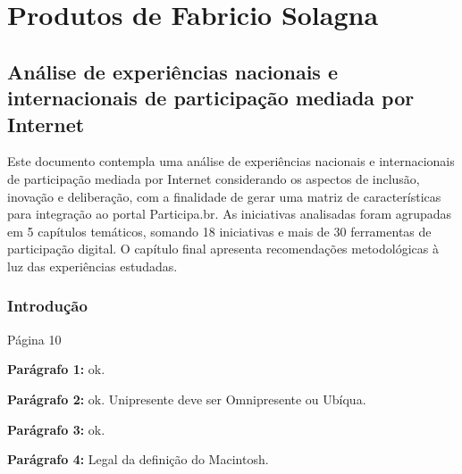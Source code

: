 \documentclass[12pt]{report}
\newcommand{\PalavrasChave}{reconhecimento de padrões, redes complexas, processamento de linguagem natural, participação social}
\newcommand{\pp}[1]{

\textbf{Parágrafo #1:}
}
\begin{document}



\tableofcontents
\newpage


\begin{abstract}
Este documento registra a reflexão sobre produtos dos outros consultores do mesmo projeto (BRA/12/018).
Cada consultor entrega alguns ``produtos'' para os órgãos interessados. No caso, são documentos escritos,
que relatam atividades, pesquisas, propostas, enfim, o que for pertinente para o trabalho.
Na leitura destes documentos, são registradas anotações pertinentes à consultoria de contrato 2013/000566, sob responsabilidade
do autor deste produto extra. Cada parte do documento corresponde a um consultor, cada capítulo corresponde
a um documento/produto, as seções e subseções correspondem à estrutura original de cada documento considerado.\\

{\bf Palavras-chave:} \PalavrasChave.
\end{abstract}
\newpage
\part{Produtos de Fabricio Solagna}
\chapter{Análise de experiências nacionais e internacionais de participação mediada por Internet}
Este documento contempla uma análise de experiências nacionais e internacionais de
participação mediada por Internet considerando os aspectos de inclusão, inovação e
deliberação, com a finalidade de gerar uma matriz de características para integração ao portal
Participa.br. As iniciativas analisadas foram agrupadas em 5 capítulos temáticos, somando 18
iniciativas e mais de 30 ferramentas de participação digital. O capítulo final apresenta
recomendações metodológicas à luz das experiências estudadas.

\section{Introdução}

Página 10

\pp{1} ok.

\pp{2} ok. Unipresente deve ser Omnipresente ou Ubíqua.

\pp{3} ok.

\pp{4} Legal da definição do Macintosh.
\end{document}
